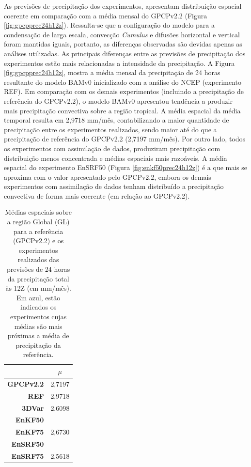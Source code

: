 As previsões de precipitação dos experimentos, apresentam distribuição espacial coerente em comparação com a média mensal do GPCPv2.2 (Figura \ref{fig:gpcpprec24h12z}). Ressalta-se que a configuração do modelo para a condensação de larga escala, convecção \textit{Cumulus} e difusões horizontal e vertical foram mantidas iguais, portanto, as diferenças observadas são devidas apenas as análises utilizadas. As principais diferenças entre as previsões de precipitação dos experimentos estão mais relacionadas a intensidade da precipitação. A Figura \ref{fig:gpcpprec24h12z}, mostra a média mensal da precipitação de 24 horas resultante do modelo BAMv0 inicializado com a análise do NCEP (experimento REF). Em comparação com os demais experimentos (incluindo a precipitação de referência do GPCPv2.2), o modelo BAMv0 apresentou tendência a produzir mais precipitação convectiva sobre a região tropical. A média espacial da média temporal resulta em 2,9718 mm/mês, contabilizando a maior quantidade de precipitação entre os experimentos realizados, sendo maior até do que a precipitação de referência do GPCPv2.2 (2,7197 mm/mês). Por outro lado, todos os experimentos com assimilação de dados, produziram precipitação com distribuição menos concentrada e médias espaciais mais razoáveis. A média espacial do experimento EnSRF50 (Figura \ref{fig:enkf50prec24h12z}) é a que mais se aproxima com o valor apresentado pelo GPCPv2.2, embora os demais experimentos com assimilação de dados tenham distribuído a precipitação convectiva de forma mais coerente (em relação ao GPCPv2.2).

\begin{table}[H]
\caption{Médias espaciais sobre a região Global (GL) para a referência (GPCPv2.2) e os experimentos realizados das previsões de 24 horas da precipitação total às 12Z (em mm/mês). Em azul, estão indicados os experimentos cujas médias são mais próximas a média de precipitação da referência.}
\begin{center}
\begin{adjustbox}{max width=\textwidth}
\begin{tabular}{rc}
\toprule
\toprule
 & $\mu$ \\
\midrule
\textbf{GPCPv2.2}    & 2,7197 \\
\textbf{REF}     & 2,9718 \\
\textbf{3DVar}   & 2,6098 \\
\textbf{EnKF50}  & \color{blue}{2,7034} \\
\textbf{EnKF75}  & 2,6730 \\
\textbf{EnSRF50} & \color{blue}{2,7045} \\
\textbf{EnSRF75} & 2,5618 \\ 
\bottomrule                                         
\end{tabular}
\end{adjustbox}
\end{center}
\label{tab:prec_aave_exps}
\end{table}

